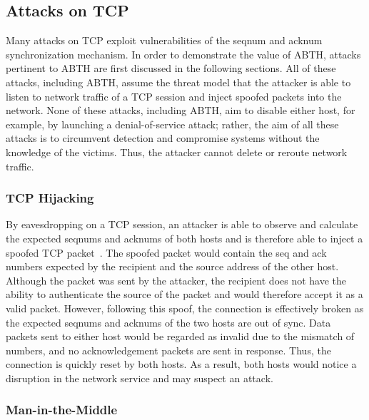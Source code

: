 \documentclass{sig-alternate}
\begin{document}
\subsection{Attacks on TCP}

Many attacks on TCP exploit vulnerabilities of the seqnum and acknum synchronization mechanism.
In order to demonstrate the value of ABTH, attacks pertinent to ABTH are first discussed in the following sections.
All of these attacks, including ABTH, assume the threat model that the attacker is able to listen to network traffic of a TCP session and inject spoofed packets into the network. None of these attacks, including ABTH, aim to disable either host, for example, by launching a denial-of-service attack; rather, the aim of all these attacks is to circumvent detection and compromise systems without the knowledge of the victims. Thus, the attacker cannot delete or reroute network traffic.

\subsubsection{TCP Hijacking}

By eavesdropping on a TCP session, an attacker is able to observe and calculate the expected seqnums and acknums of both hosts and is therefore able to inject a spoofed TCP packet~\cite{harris:tcpattacks}. The spoofed packet would contain the seq and ack numbers expected by the recipient and the source address of the other host. Although the packet was sent by the attacker, the recipient does not have the ability to authenticate the source of the packet and would therefore accept it as a valid packet. However, following this spoof, the connection is effectively broken as the expected seqnums and acknums of the two hosts are out of sync. Data packets sent to either host would be regarded as invalid due to the mismatch of numbers, and no acknowledgement packets are sent in response. Thus, the connection is quickly reset by both hosts. As a result, both hosts would notice a disruption in the network service and may suspect an attack.

\subsubsection{Man-in-the-Middle}
\end{document}
